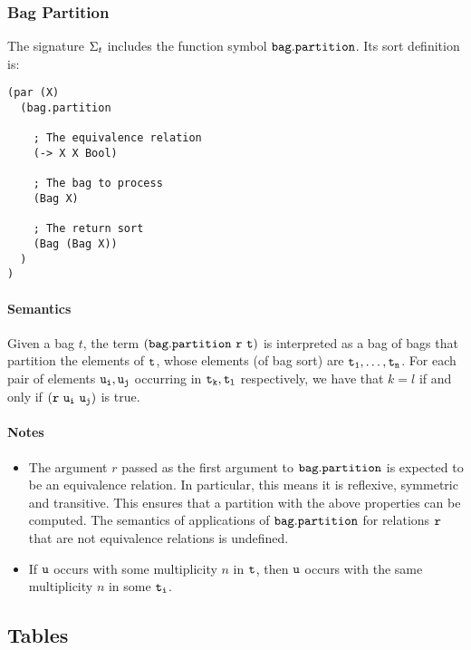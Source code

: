 \documentclass[english,a4paper,10pt]{article}
\begin{document}
\subsubsection{Bag Partition}
The signature $\Sigma_{t}$ includes 
the function symbol ${\tt bag.partition}$. Its sort definition is:

\begin{verbatim}
(par (X)
  (bag.partition
    
    ; The equivalence relation
    (-> X X Bool)
  
    ; The bag to process
    (Bag X)
    
    ; The return sort
    (Bag (Bag X))
  )
)
\end{verbatim}

\paragraph{Semantics}
Given a bag $t$, 
the term $\syntax{(bag.partition\ r\ t)}$ is interpreted
as a bag of bags that partition the elements of ${\tt t}$,
whose elements (of bag sort) are ${\tt t_1}, \ldots, {\tt t_n}$.
For each pair of elements ${\tt u_i}, {\tt u_j}$
occurring in ${\tt t_k}, {\tt t_l}$ respectively,
we have that $k=l$ if and only if ${\tt (r\ u_i\ u_j)}$ is true.

\paragraph{Notes}
\begin{itemize}
\item
The argument $r$ passed as the
first argument to ${\tt bag.partition}$ is expected to be an equivalence relation.
In particular, this means it is reflexive, symmetric and transitive.
This ensures that a partition with the above properties
can be computed.
The semantics of applications of ${\tt bag.partition}$ for relations ${\tt r}$
that are not equivalence relations is undefined.
\item
If ${\tt u}$ occurs with some multiplicity $n$ in ${\tt t}$,
then ${\tt u}$ occurs with the same multiplicity $n$ in some ${\tt t_i}$.
\end{itemize}

\subsection{Tables}
\end{document}
